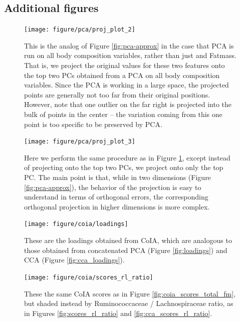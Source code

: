 \documentclass{article}
\begin{document}
\subsection{Additional figures}

\begin{figure}
  \texttt{[image: figure/pca/proj\_plot\_2]}
  \caption{This is the analog of Figure \ref{fig:pca-approx} in the case that
    PCA is run on all body composition variables, rather than just  and
    Fatmass. That is, we project the original values for these two features
    onto the top two PCs obtained from a PCA on all body composition variables.
    Since the PCA is working in a large space, the projected points are
    generally not too far from their original positions. However, note that one
    outlier on the far right is projected into the bulk of points in the center
    -- the variation coming from this one point is too specific to be preserved
    by PCA.
  \label{fig:pca-approx-2}}
\end{figure}

\begin{figure}
  \texttt{[image: figure/pca/proj\_plot\_3]}
  \caption{Here we perform the same procedure as in Figure
    \ref{fig:pca-approx-2}, except instead of projecting onto the top two PCs,
    we project onto only the top PC. The main point is that, while in two
    dimensions (Figure \ref{fig:pca-approx}), the behavior of the projection is
    easy to understand in terms of orthogonal errors, the corresponding
    orthogonal projection in higher dimensions is more complex.
  \label{fig:pca-approx-3}}
\end{figure}

\begin{figure}[ht]
  \centering \texttt{[image: figure/coia/loadings]}
  \caption{These are the loadings obtained from CoIA, which are analogous to
    those obtained from concatenated PCA (Figure \ref{fig:loadings}) and CCA
    (Figure \ref{fig:cca_loadings}). \label{fig:coia_loadings} }
\end{figure}

\begin{figure}[ht]
  \centering
  \texttt{[image: figure/coia/scores\_rl\_ratio]}
  \caption{These the same CoIA scores as in Figure \ref{fig:coia_scores_total_fm},
    but shaded instead by Ruminococcaceae / Lachnospiraceae ratio, as in Figures
    \ref{fig:scores_rl_ratio} and
    \ref{fig:cca_scores_rl_ratio}. \label{fig:coia_scores_rl_ratio} }
\end{figure}
\end{document}
